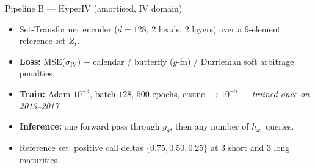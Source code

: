 \documentclass[10pt,aspectratio=169]{beamer}
\newcommand{\iv}{\sigma_{\mathrm{IV}}}
\begin{document}
\begin{frame}{Pipeline B --- HyperIV (amortised, IV domain)}
\centering
{}
\medskip
\begin{itemize}\small
  \item Set-Transformer encoder ($d{=}128$, $2$ heads, $2$ layers) over a $9$-element reference set $Z_t$.
  \item \textbf{Loss:} MSE($\iv$) + calendar / butterfly ($g$-fn) / Durrleman soft arbitrage penalties.
  \item \textbf{Train:} Adam $10^{-3}$, batch $128$, $500$ epochs, cosine $\to 10^{-5}$ --- \emph{trained once on 2013--2017}.
  \item \textbf{Inference:} one forward pass through $g_\theta$, then any number of $h_{\omega_t}$ queries.
  \item Reference set: positive call deltas $\{0.75, 0.50, 0.25\}$ at $3$ short and $3$ long maturities.
\end{itemize}
\end{frame}
\end{document}
